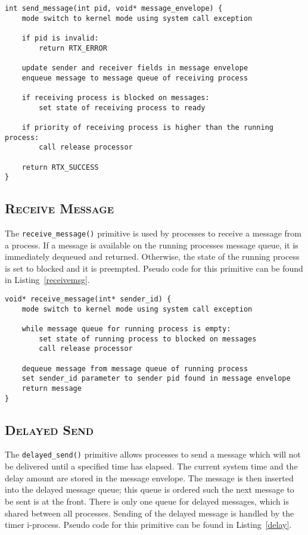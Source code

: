 \documentclass[oneside]{report}
\begin{document}
\begin{lstlisting}
int send_message(int pid, void* message_envelope) {
    mode switch to kernel mode using system call exception

    if pid is invalid:
        return RTX_ERROR

    update sender and receiver fields in message envelope
    enqueue message to message queue of receiving process

    if receiving process is blocked on messages:
        set state of receiving process to ready

    if priority of receiving process is higher than the running process:
        call release processor

    return RTX_SUCCESS
}
\end{lstlisting}

\subsection{\textsc{Receive Message}}

The \texttt{receive\_message()} primitive is used by processes to
receive a message from a process. If a message is available on the
running processes message queue, it is immediately dequeued and
returned. Otherwise, the state of the running process is set to
blocked and it is preempted. Pseudo code for this primitive can be
found in Listing~\ref{receivemsg}.

\begin{lstlisting}
void* receive_message(int* sender_id) {
    mode switch to kernel mode using system call exception

    while message queue for running process is empty:
        set state of running process to blocked on messages
        call release processor

    dequeue message from message queue of running process
    set sender_id parameter to sender pid found in message envelope
    return message
}
\end{lstlisting}

\subsection{\textsc{Delayed Send}}

The \texttt{delayed\_send()} primitive allows processes to send a
message which will not be delivered until a specified time has
elapsed. The current system time and the delay amount are stored in
the message envelope. The message is then inserted into the delayed
message queue; this queue is ordered such the next message to be sent is at
the front. There is only one queue for delayed messages, which is shared
between all processes. Sending of the delayed message is handled by
the timer i-process. Pseudo code for this primitive can be found in
Listing~\ref{delay}.
\end{document}

